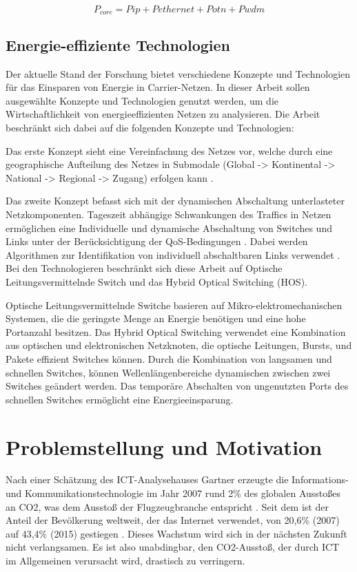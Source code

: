\documentclass[12pt,titlepage]{article}
\begin{document}
\begin{equation}
P_{core} = Pip + Pethernet + Potn + Pwdm
\end{equation}


\subsection{Energie-effiziente Technologien}
Der aktuelle Stand der Forschung bietet verschiedene Konzepte und Technologien für das Einsparen von Energie in Carrier-Netzen. In dieser Arbeit sollen ausgewählte Konzepte und Technologien genutzt werden, um die Wirtschaftlichkeit von energieeffizienten Netzen zu analysieren. Die Arbeit beschränkt sich dabei auf die folgenden Konzepte und Technologien: 

Das erste Konzept sieht eine Vereinfachung des Netzes vor, welche durch eine geographische Aufteilung des Netzes in Submodale (Global -> Kontinental -> National -> Regional -> Zugang) erfolgen kann \cite{aleksic2014}.

Das zweite Konzept befasst sich mit der dynamischen Abschaltung unterlasteter Netzkomponenten. Tageszeit abhängige Schwankungen des Traffics in Netzen ermöglichen eine Individuelle und dynamische Abschaltung von Switches und Links unter der Berücksichtigung der QoS-Bedingungen \cite{aleksic2013}. Dabei werden Algorithmen zur Identifikation von individuell abschaltbaren Links verwendet \cite{fisher}.
Bei den Technologieren beschränkt sich diese Arbeit auf Optische Leitungsvermittelnde Switch und das Hybrid Optical Switching (HOS). 

Optische Leitungsvermittelnde Switche basieren auf Mikro-elektromechanischen Systemen, die die geringste Menge an Energie benötigen und eine hohe Portanzahl besitzen. Das Hybrid Optical Switching verwendet eine Kombination aus optischen und elektronischen Netzknoten, die optische Leitungen, Bursts, und Pakete effizient Switches können. Durch die Kombination von langsamen und schnellen Switches, können Wellenlängenbereiche dynamischen zwischen zwei Switches geändert werden. Das temporäre Abschalten von ungenutzten Ports des schnellen Switches ermöglicht eine Energieeinsparung.  \cite{aleksic2013}



\section{Problemstellung und Motivation}
Nach einer Schätzung des ICT-Analysehauses Gartner erzeugte die Informations- und Kommunikationstechnologie im Jahr 2007 rund 2\% des globalen Ausstoßes an CO2, was dem Ausstoß der Flugzeugbranche entspricht \cite{gartner}. Seit dem ist der Anteil der Bevölkerung weltweit, der das Internet verwendet, von 20,6\% (2007) auf 43,4\% (2015) gestiegen \cite{itu}. Dieses Wachstum wird sich in der nächsten Zukunft nicht verlangsamen. Es ist also unabdingbar, den CO2-Ausstoß, der durch ICT im Allgemeinen verursacht wird, drastisch zu verringern.
\end{document}
